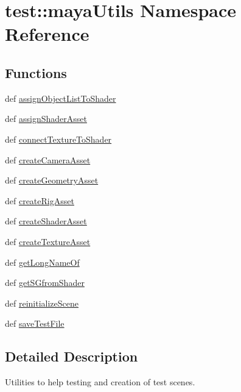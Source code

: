 \hypertarget{namespacetest_1_1mayaUtils}{\section{test\-:\-:maya\-Utils \-Namespace \-Reference}
\label{de/de7/namespacetest_1_1mayaUtils}
}
\subsection*{\-Functions}
\begin{DoxyCompactItemize}
\item 
def \hyperlink{namespacetest_1_1mayaUtils_af56124450cd058165342b14f1f34fa5a}{assign\-Object\-List\-To\-Shader}
\item 
def \hyperlink{namespacetest_1_1mayaUtils_a71c569a2e8b606f0bb4cf1afe8c62626}{assign\-Shader\-Asset}
\item 
def \hyperlink{namespacetest_1_1mayaUtils_a2bc620c2195720c32df2904a8212b986}{connect\-Texture\-To\-Shader}
\item 
def \hyperlink{namespacetest_1_1mayaUtils_abfa64de7e79d966e1f452190a48c4f5a}{create\-Camera\-Asset}
\item 
def \hyperlink{namespacetest_1_1mayaUtils_a8f949ae8c5fa0bffdf9d529a5282395a}{create\-Geometry\-Asset}
\item 
def \hyperlink{namespacetest_1_1mayaUtils_a09c4eebc43cd10a7aa68917201dcecde}{create\-Rig\-Asset}
\item 
def \hyperlink{namespacetest_1_1mayaUtils_a7e1e5f53e96e10da18c90f707b2d0f67}{create\-Shader\-Asset}
\item 
def \hyperlink{namespacetest_1_1mayaUtils_a2a04db46c3190c7aa95016dfc0f62f49}{create\-Texture\-Asset}
\item 
def \hyperlink{namespacetest_1_1mayaUtils_ab88d0ede8adb7c69681a541d951b7cb4}{get\-Long\-Name\-Of}
\item 
def \hyperlink{namespacetest_1_1mayaUtils_ac778e89063f6d27dc15c947ee8425a5e}{get\-S\-Gfrom\-Shader}
\item 
def \hyperlink{namespacetest_1_1mayaUtils_a9edbee70667fdc49a07e46ed7b5b4479}{reinitialize\-Scene}
\item 
def \hyperlink{namespacetest_1_1mayaUtils_aa43119fb2f03bdd18048cef53f11abd0}{save\-Test\-File}
\end{DoxyCompactItemize}


\subsection{\-Detailed \-Description}
\begin{DoxyVerb}
Utilities to help testing and creation of test scenes.
\end{DoxyVerb}
 


